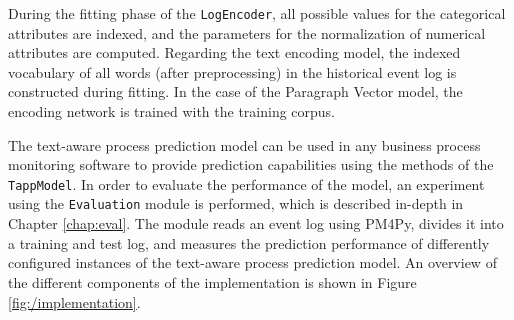 During the fitting phase of the  \texttt{LogEncoder}, all possible values for the categorical attributes are indexed, and the parameters for the normalization of numerical attributes are computed.
Regarding the text encoding model, the indexed vocabulary of all words (after preprocessing) in the historical event log is constructed during fitting.
In the case of the Paragraph Vector model, the encoding network is trained with the training corpus.

The text-aware process prediction model can be used in any business process monitoring software to provide prediction capabilities using the methods of the \texttt{TappModel}.
In order to evaluate the performance of the model, an experiment using the \texttt{Evaluation} module is performed, which is described in-depth in Chapter \ref{chap:eval}.
The module reads an event log using PM4Py, divides it into a training and test log, and measures the prediction performance of differently configured instances of the text-aware process prediction model.
An overview of the different components of the implementation is shown in Figure \ref{fig:/implementation}.
